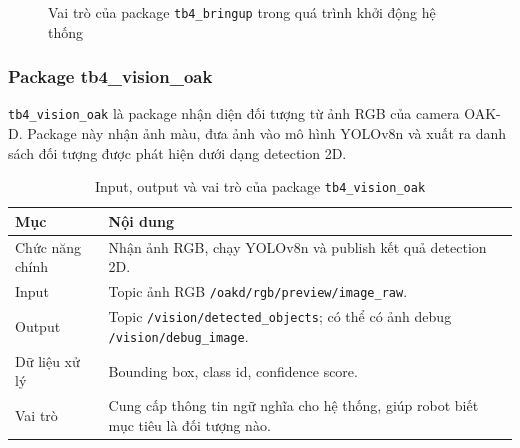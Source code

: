 \begin{figure}[H]
\centering
{}
\caption{Vai trò của package \texttt{tb4\_bringup} trong quá trình khởi động hệ thống}
\label{fig:tb4-bringup-role}
\end{figure}

\subsubsection{Package tb4\_vision\_oak}
\label{subsubsec:tb4-vision-oak}

\texttt{tb4\_vision\_oak} là package nhận diện đối tượng từ ảnh RGB của camera OAK-D. Package này nhận ảnh màu, đưa ảnh vào mô hình YOLOv8n và xuất ra danh sách đối tượng được phát hiện dưới dạng detection 2D.

\begin{table}[H]
    \centering
    \caption{Input, output và vai trò của package \texttt{tb4\_vision\_oak}}
    \label{tab:tb4-vision-oak}
    \renewcommand{\arraystretch}{1.25}
    \small
    \begin{tabularx}{\textwidth}{|>{\raggedright\arraybackslash}p{}|>{\raggedright\arraybackslash}X|}
        \hline
        \textbf{Mục} & \textbf{Nội dung} \\
        \hline
        Chức năng chính & Nhận ảnh RGB, chạy YOLOv8n và publish kết quả detection 2D. \\
        \hline
        Input & Topic ảnh RGB \texttt{/oakd/rgb/preview/image\_raw}. \\
        \hline
        Output & Topic \texttt{/vision/detected\_objects}; có thể có ảnh debug \texttt{/vision/debug\_image}. \\
        \hline
        Dữ liệu xử lý & Bounding box, class id, confidence score. \\
        \hline
        Vai trò & Cung cấp thông tin ngữ nghĩa cho hệ thống, giúp robot biết mục tiêu là đối tượng nào. \\
        \hline
    \end{tabularx}
\end{table}

